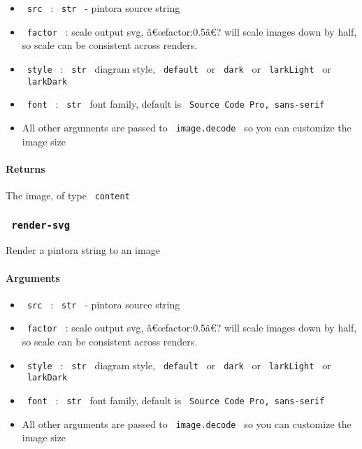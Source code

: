 \begin{itemize}
\tightlist
\item
  \texttt{\ src\ } : \texttt{\ str\ } - pintora source string
\item
  \texttt{\ factor\ } : scale output svg, â€œfactor:0.5â€? will scale
  images down by half, so scale can be consistent across renders.
\item
  \texttt{\ style\ } : \texttt{\ str\ } diagram style,
  \texttt{\ default\ } or \texttt{\ dark\ } or \texttt{\ larkLight\ } or
  \texttt{\ larkDark\ }
\item
  \texttt{\ font\ } : \texttt{\ str\ } font family, default is
  \texttt{\ Source\ Code\ Pro,\ sans-serif\ }
\item
  All other arguments are passed to \texttt{\ image.decode\ } so you can
  customize the image size
\end{itemize}

\paragraph{Returns}\label{returns}

The image, of type \texttt{\ content\ }

\subsubsection{\texorpdfstring{\texttt{\ render-svg\ }}{ render-svg }}\label{render-svg}

Render a pintora string to an image

\paragraph{Arguments}\label{arguments-1}

\begin{itemize}
\tightlist
\item
  \texttt{\ src\ } : \texttt{\ str\ } - pintora source string
\item
  \texttt{\ factor\ } : scale output svg, â€œfactor:0.5â€? will scale
  images down by half, so scale can be consistent across renders.
\item
  \texttt{\ style\ } : \texttt{\ str\ } diagram style,
  \texttt{\ default\ } or \texttt{\ dark\ } or \texttt{\ larkLight\ } or
  \texttt{\ larkDark\ }
\item
  \texttt{\ font\ } : \texttt{\ str\ } font family, default is
  \texttt{\ Source\ Code\ Pro,\ sans-serif\ }
\item
  All other arguments are passed to \texttt{\ image.decode\ } so you can
  customize the image size
\end{itemize}

